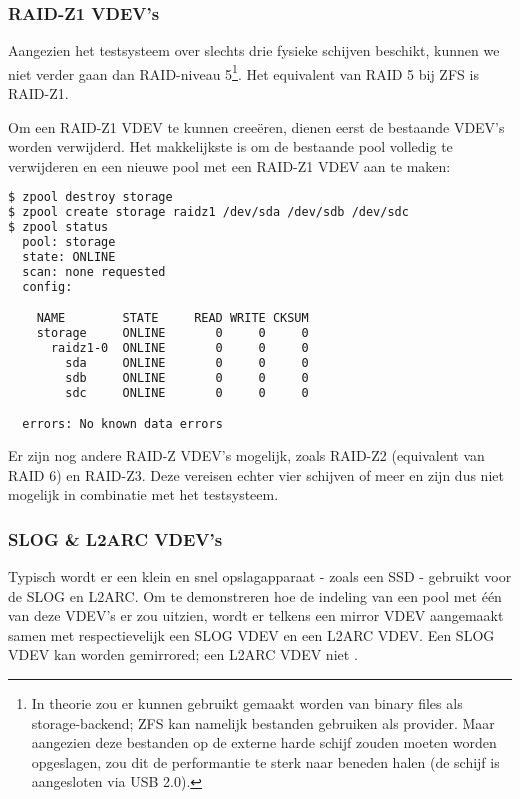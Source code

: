 \subsubsection{RAID-Z1 VDEV's}

Aangezien het testsysteem over slechts drie fysieke schijven beschikt, kunnen we niet verder gaan dan RAID-niveau 5\footnote{In theorie zou er kunnen gebruikt gemaakt worden van binary files als storage-backend; ZFS kan namelijk bestanden gebruiken als provider. Maar aangezien deze bestanden op de externe harde schijf zouden moeten worden opgeslagen, zou dit de performantie te sterk naar beneden halen (de schijf is aangesloten via USB 2.0).}. Het equivalent van RAID 5 bij ZFS is RAID-Z1.  

Om een RAID-Z1 VDEV te kunnen creeëren, dienen eerst de bestaande VDEV's worden verwijderd. Het makkelijkste is om de bestaande pool volledig te verwijderen en een nieuwe pool met een RAID-Z1 VDEV aan te maken:

\begin{lstlisting}[language=bash,style=command_style]
$ zpool destroy storage
$ zpool create storage raidz1 /dev/sda /dev/sdb /dev/sdc
$ zpool status
  pool: storage
  state: ONLINE
  scan: none requested
  config:

	NAME        STATE     READ WRITE CKSUM
	storage     ONLINE       0     0     0
	  raidz1-0  ONLINE       0     0     0
	    sda     ONLINE       0     0     0
	    sdb     ONLINE       0     0     0
	    sdc     ONLINE       0     0     0

  errors: No known data errors
\end{lstlisting}

Er zijn nog andere RAID-Z VDEV's mogelijk, zoals RAID-Z2 (equivalent van RAID 6) en RAID-Z3. Deze vereisen echter vier schijven of meer en zijn dus niet mogelijk in combinatie met het testsysteem.

\subsubsection{SLOG \& L2ARC VDEV's}

Typisch wordt er een klein en snel opslagapparaat - zoals een SSD - gebruikt voor de SLOG en L2ARC. Om te demonstreren hoe de indeling van een pool met één van deze VDEV's er zou uitzien, wordt er telkens een mirror VDEV aangemaakt samen met respectievelijk een SLOG VDEV en een L2ARC VDEV. Een SLOG VDEV kan worden gemirrored; een L2ARC VDEV niet \autocite{FBSDDP2017}.

